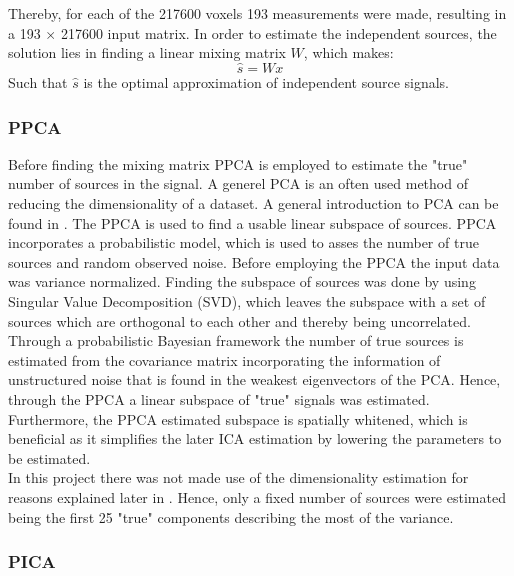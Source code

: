 Thereby, for each of the 217600 voxels 193 measurements were made, resulting in a 193 $\times$ 217600 input matrix. In order to estimate the independent sources, the solution lies in finding a linear mixing matrix $W$, which makes:
\begin{equation}
\widehat{s}= Wx
\end{equation}  
Such that $\widehat{s}$ is the optimal approximation of independent source signals. 
\subsubsection{PPCA}

Before finding the mixing matrix PPCA is employed to estimate the "true" number of sources in the signal. A generel PCA is an often used method of reducing the dimensionality of a dataset. A general introduction to PCA can be found in . The PPCA is used to find a usable linear subspace of sources. PPCA incorporates a probabilistic model, which is used to asses the number of true sources and random observed noise. Before employing the PPCA the input data was variance normalized. Finding the subspace of sources was done by using Singular Value Decomposition (SVD), which leaves the subspace with a set of sources which are orthogonal to each other and thereby being uncorrelated. Through a probabilistic Bayesian framework the number of true sources is estimated from the covariance matrix incorporating the information of unstructured noise that is found in the weakest eigenvectors of the PCA. Hence, through the PPCA a linear subspace of "true" signals was estimated. Furthermore, the PPCA estimated subspace is spatially whitened, which is beneficial as it simplifies the later ICA estimation by lowering the parameters to be estimated.  \\
In this project there was not made use of the dimensionality estimation for reasons explained later in . Hence, only a fixed number of sources were estimated being the first 25 "true" components describing the most of the variance.

\subsubsection{PICA}

